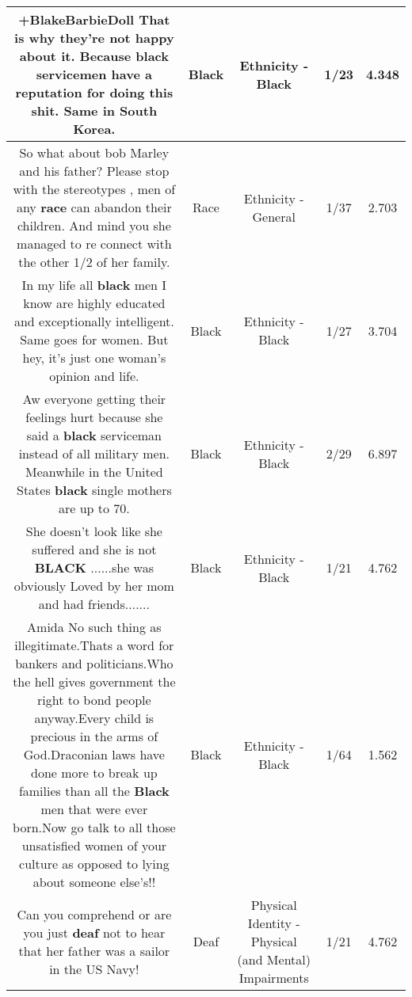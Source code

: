 \documentclass[11pt]{article}
\newlength\mylength
\begin{document}
\begin{center}
\begin{longtable}{|C{.65\mylength}|C{.30\mylength}|C{.12\mylength}|C{.12\mylength}|C{.12\mylength}|}
  \small +BlakeBarbieDoll That is why they're not happy about it. Because \textbf{black} servicemen have a reputation for doing this shit. Same in South Korea.\normalsize   & Black & Ethnicity - Black & 1/23 & 4.348 \\  \hline
  \small So what about bob Marley and his father? Please stop with the stereotypes , men of any \textbf{race} can abandon their children. And mind you she managed to re connect with the other 1/2 of her family.\normalsize   & Race & Ethnicity - General & 1/37 & 2.703 \\  \hline
  \small In my life all \textbf{black} men I know are highly educated and exceptionally intelligent. Same goes for women. But hey, it's just one woman's opinion and life.\normalsize   & Black & Ethnicity - Black & 1/27 & 3.704 \\  \hline
  \small Aw everyone getting their feelings hurt because she said a \textbf{black} serviceman instead of all military men. Meanwhile in the United States \textbf{black} single mothers are up to 70.\normalsize   & Black & Ethnicity - Black & 2/29 & 6.897 \\  \hline
  \small She doesn't look like she suffered and she is not \textbf{BLACK} ......she was obviously Loved by her mom and had friends.......\normalsize   & Black & Ethnicity - Black & 1/21 & 4.762 \\  \hline
  \small Amida No such thing as illegitimate.Thats a word for bankers and politicians.Who the hell gives government the right to bond people anyway.Every child is precious in the arms of God.Draconian laws have done more to break up families than all the \textbf{Black} men that were ever born.Now go talk to all those unsatisfied women of your culture as opposed to lying about someone else's!!\normalsize   & Black & Ethnicity - Black & 1/64 & 1.562 \\  \hline
  \small Can you comprehend or are you just \textbf{deaf} not to hear that her father was a sailor in the US Navy!\normalsize   & Deaf & Physical Identity - Physical (and Mental) Impairments & 1/21 & 4.762 \\  \hline

\end{longtable}
\end{center}
\end{document}

